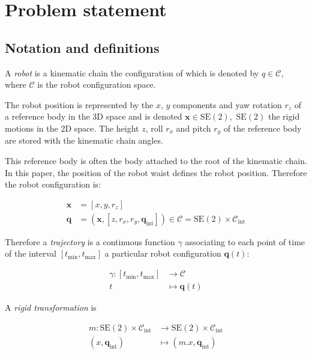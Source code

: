 \section{Problem statement} \label{problem}
\subsection{Notation and definitions}

A \emph{robot} is a kinematic chain the configuration of which is
denoted by \mbox{$q \in \mathcal{C}$}, where $\mathcal{C}$ is the
robot configuration space.

The robot position is represented by the $x$, $y$ components
and yaw rotation $r_z$ of a reference body in the 3D space and is
denoted \mbox{$\mathbf{x} \in \text{SE}(2)$, $\text{SE}(2)$} the rigid
motions in the 2D space.  The height $z$, roll $r_x$ and pitch $r_y$
of the reference body are stored with the kinematic chain angles.

This reference body is often the body attached to the root of the
kinematic chain. In this paper, the position of the robot waist
defines the robot position. Therefore the robot configuration is:

\begin{equation} \label{eq:cfg}
  \begin{aligned}
    \mathbf{x} &= [x, y, r_z]\\
    \mathbf{q} &= (\mathbf{x}, [z, r_x, r_y, \mathbf{q}_{\text{int}}])
    \in \mathcal{C} = \text{SE}(2) \times \mathcal{C}_{\text{int}}
  \end{aligned}
\end{equation}



Therefore a \emph{trajectory} is a continuous function $\gamma$
associating to each point of time of the interval
\mbox{$[t_{\text{min}}, t_{\text{max}}]$} a particular robot
configuration \mbox{$\textbf{q}(t)$}:

\begin{equation} \label{eq:traj}
  \begin{aligned}
    \gamma \colon [t_{\text{min}}, t_{\text{max}}] &\to \mathcal{C}\\
    t &\mapsto \mathbf{q}(t)
  \end{aligned}
\end{equation}


A \emph{rigid transformation} is

\begin{equation} \label{eq:rigidtrans}
  \begin{aligned}
    m \colon \text{SE}(2) \times \mathcal{C}_{\text{int}} &\to \text{SE}(2) \times \mathcal{C}_{\text{int}}\\
    (x, \mathbf{q}_{\text{int}}) &\mapsto (m . x, \mathbf{q}_{\text{int}})
  \end{aligned}
\end{equation}


